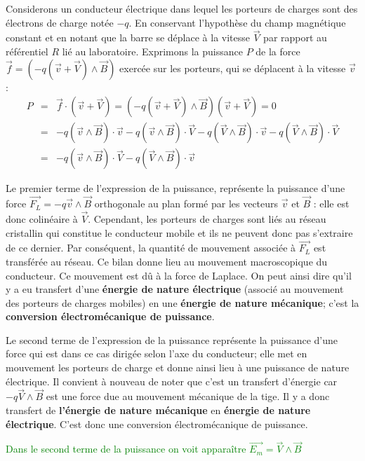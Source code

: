 \documentclass[12pt,prb,aps,epsf]{article}
\begin{document}
Considerons un conducteur électrique dans lequel les porteurs de charges sont des électrons de charge notée $-q$. En conservant l'hypothèse du champ magnétique constant et en notant que la barre se déplace à la vitesse $\vec{V}$ par rapport au référentiel $R$ lié au laboratoire. Exprimons la puissance $P$ de la force $\vec{f}=(-q(\vec{v} + \vec{V}) \land \vec{B})$ exercée sur les porteurs, qui se déplacent à la vitesse $\vec{v}$ :
\begin{eqnarray}
    P &=& \vec{f} \cdot (\vec{v} + \vec{V}) = (-q(\vec{v} + \vec{V})\land \vec{B} ) (\vec{v} + \vec{V}) = 0\\
 &=& -q ( \vec{v}  \land \vec{B} ) \cdot \vec{v} -q( \vec{v}  \land \vec{B} ) \cdot \vec{V} -q ( \vec{V}  \land \vec{B} ) \cdot \vec{v} -q ( \vec{V}  \land \vec{B} ) \cdot \vec{V}\\
     &=& -q (\vec{v}  \land \vec{B} ) \cdot \vec{V} -q ( \vec{V}  \land \vec{B} ) \cdot \vec{v}
\end{eqnarray}

Le premier terme de l'expression de la puissance, représente la puissance d'une force $\vec{F_L} = -q \vec{v} \land \vec{B} $ orthogonale au plan formé par les vecteurs $\vec{v}$ et $\vec{B}$ : elle est donc colinéaire à $\vec{V}$. Cependant, les porteurs de charges sont liés au réseau cristallin qui constitue le conducteur mobile et ils ne peuvent donc pas s'extraire de ce dernier. Par conséquent, la quantité de mouvement associée à $\vec{F_L}$ est transférée au réseau. Ce bilan donne lieu au mouvement macroscopique du conducteur. Ce mouvement est dû à la force de Laplace. On peut ainsi dire qu'il y a eu transfert d'une \textbf{énergie de nature électrique} (associé au mouvement des porteurs de charges mobiles) en une \textbf{énergie de nature mécanique}; c'est la \textbf{conversion électromécanique de puissance}. \medskip

Le second terme de l'expression de la puissance représente la puissance d'une force qui est dans ce cas dirigée selon l'axe du conducteur; elle met en mouvement les porteurs de charge et donne ainsi lieu à une puissance de nature électrique. Il convient à nouveau de noter que c'est un transfert d'énergie car $-q\vec{V}\land \vec{B}$ est une force due au mouvement mécanique de la tige. Il y a donc transfert de \textbf{l'énergie de nature mécanique} en \textbf{énergie de nature électrique}. C'est donc une conversion électromécanique de puissance.\medskip

\textcolor{green}{Dans le second terme de la puissance on voit apparaître $\vec{E_m}=\vec{V} \land \vec{B}$}
\end{document}
